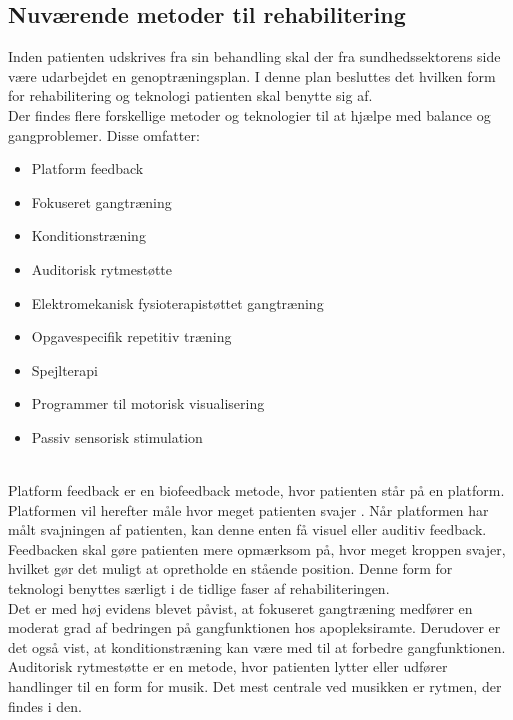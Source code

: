 \subsection{Nuværende metoder til rehabilitering}

Inden patienten udskrives fra sin behandling skal der fra sundhedssektorens side være udarbejdet en genoptræningsplan. I denne plan besluttes det hvilken form for rehabilitering og teknologi patienten skal benytte sig af. \cite{Sundhedsstyrelsen2011a} \\
Der findes flere forskellige metoder og teknologier til at hjælpe med balance og gangproblemer. Disse omfatter: 

\begin{itemize}
\item Platform feedback
\item Fokuseret gangtræning
\item Konditionstræning
\item Auditorisk rytmestøtte
\item Elektromekanisk fysioterapistøttet gangtræning
\item Opgavespecifik repetitiv træning
\item Spejlterapi
\item Programmer til motorisk visualisering
\item Passiv sensorisk stimulation
\end{itemize}
 \cite{Sundhedsstyrelsen2011a} \\
Platform feedback er en biofeedback metode, hvor patienten står på en platform. Platformen vil herefter måle hvor meget patienten svajer . Når platformen har målt svajningen af patienten, kan denne enten få visuel eller auditiv feedback. Feedbacken skal gøre patienten mere opmærksom på, hvor meget kroppen svajer, hvilket gør det muligt at opretholde en stående position.%
Denne form for teknologi benyttes særligt i de tidlige faser af rehabiliteringen\cite{Sundhedsstyrelsen2011a}. \\
Det er med høj evidens blevet påvist, at fokuseret gangtræning medfører en moderat grad af bedringen på gangfunktionen hos apopleksiramte\cite{Sundhedsstyrelsen2010}. Derudover er det også vist, at konditionstræning kan være med til at forbedre gangfunktionen\cite{Sundhedsstyrelsen2010}. \\
Auditorisk rytmestøtte er en metode, hvor patienten lytter eller udfører handlinger til en form for musik. Det mest centrale ved musikken er rytmen, der findes i den.%
